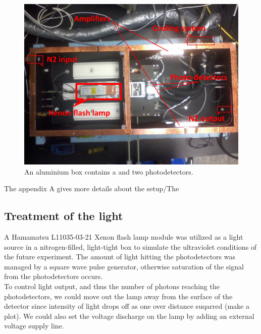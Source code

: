   \begin{figure}[!hbtp]
  \centering
  \includegraphics[totalheight=.35\textwidth,trim=0cm 7cm 0cm 2.5cm, clip=true,]{../Pictures/blabla/box.jpg}%
  \caption{An aluminium box contains a \xfl and two photodetectors.}
  \label{fig:DN_AP_CT}
  \end{figure}
  
  The appendix A gives more details about the setup/The 
  
  \subsection{Treatment of the light}
  
  A Hamamatsu L11035-03-21 Xenon flash lamp module was utilized as a light source in a nitrogen-filled, light-tight box to simulate the 
  ultraviolet conditions of the future experiment. 
  The amount of light hitting the photodetectors was managed by a square wave pulse generator, otherwise saturation of the signal from the 
  photodetectors occurs. 
  \\
  To control light output, and thus the number of photons reaching the photodetectors, we could move out the lamp away from the surface of the detector 
  since intensity of light drops off as one over distance suqarred (make a plot). We could also set the voltage discharge on the lamp 
  by adding an external voltage supply line. 
  
